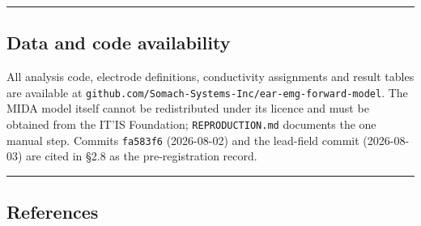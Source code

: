 \documentclass[
  11pt,
]{article}
\begin{document}
\begin{center}\rule{0.5\linewidth}{0.5pt}\end{center}

\FloatBarrier
\subsection{Data and code availability}\label{data-and-code-availability}

All analysis code, electrode definitions, conductivity assignments and result
tables are available at \texttt{github.com/Somach-Systems-Inc/ear-emg-forward-model}.
The MIDA model itself cannot be redistributed under its licence and must be
obtained from the IT'IS Foundation; \texttt{REPRODUCTION.md} documents the one manual
step. Commits \texttt{fa583f6} (2026-08-02) and the lead-field commit (2026-08-03) are
cited in §2.8 as the pre-registration record.

\begin{center}\rule{0.5\linewidth}{0.5pt}\end{center}

\FloatBarrier
\subsection{References}\label{references}
\end{document}
